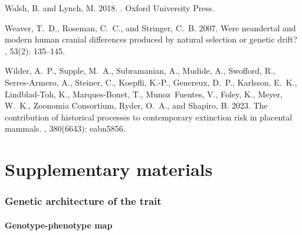 \documentclass{article}
\renewcommand{\baselinestretch}{1.5}
\begin{document}
\begin{thebibliography}{}
    Walsh, B. and Lynch, M. 2018.
    .
    \newblock Oxford University Press.

    Weaver, T.~D., Roseman, C.~C., and Stringer, C.~B. 2007.
    \newblock Were neandertal and modern human cranial differences produced by
    natural selection or genetic drift?
    , {53}(2): 135--145.

    Wilder, A.~P., Supple, M.~A., Subramanian, A., Mudide, A., Swofford, R.,
        {Serres-Armero}, A., Steiner, C., Koepfli, K.-P., Genereux, D.~P., Karlsson,
    E.~K., {Lindblad-Toh}, K., {Marques-Bonet}, T., Munoz~Fuentes, V., Foley, K.,
    Meyer, W.~K., {Zoonomia Consortium}, Ryder, O.~A., and Shapiro, B. 2023.
    \newblock The contribution of historical processes to contemporary extinction
    risk in placental mammals.
    , {380}(6643): eabn5856.

\end{thebibliography}



\newpage

\part*{Supplementary materials}
\renewcommand{\thetable}{S\arabic{table}}
\renewcommand{\thefigure}{S\arabic{figure}}
\setcounter{figure}{0}
\setcounter{table}{0}
\setcounter{section}{0}

\renewcommand{\baselinestretch}{1.0}\normalsize
\tableofcontents
\renewcommand{\baselinestretch}{1.5}\normalsize

\newpage
\section{Genetic architecture of the trait}\label{sec:simulator}

\subsection{Genotype-phenotype map}\label{subsec:genotype-phenotype-map}
\end{document}
